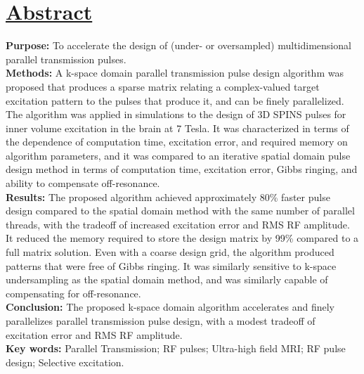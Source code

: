 \documentclass[11pt]{article}
\begin{document}
\section*{\underline{Abstract}} 
{\bf Purpose:}
To accelerate the design of (under- or oversampled) multidimensional parallel transmission pulses. 
\\[1em]
{\bf Methods:}
A k-space domain parallel transmission pulse design algorithm was proposed that
produces a sparse matrix relating a complex-valued target excitation pattern to the pulses that produce it, 
and can be finely parallelized. 
The algorithm was applied in simulations to the design of 3D SPINS pulses for inner volume excitation in the brain at 7 Tesla.
It was characterized in terms of the dependence of computation time, excitation error, and required memory
on algorithm parameters,
and it was compared to an iterative spatial domain pulse design method in terms of computation time, excitation error,
Gibbs ringing, and ability to compensate off-resonance.
\\[1em]
{\bf Results:}
The proposed algorithm achieved approximately 80\% faster pulse design compared to 
the spatial domain method with the same number of parallel threads,
with the tradeoff of increased excitation error and RMS RF amplitude. 
It reduced the memory required to store the design matrix by 99\% compared to a full matrix solution.
Even with a coarse design grid, the algorithm produced patterns that were free of Gibbs ringing.
It was similarly sensitive to k-space undersampling as the spatial domain method,
and was similarly capable of compensating for off-resonance.
\\[1em]
{\bf Conclusion:}
The proposed k-space domain algorithm accelerates and finely parallelizes parallel transmission pulse design,
with a modest tradeoff of excitation error and RMS RF amplitude.
\\[1em]
{\bf \noindent Key words:} Parallel Transmission; RF pulses; Ultra-high field MRI; RF pulse design; Selective excitation.

\pagebreak














\pagebreak
\end{document}
